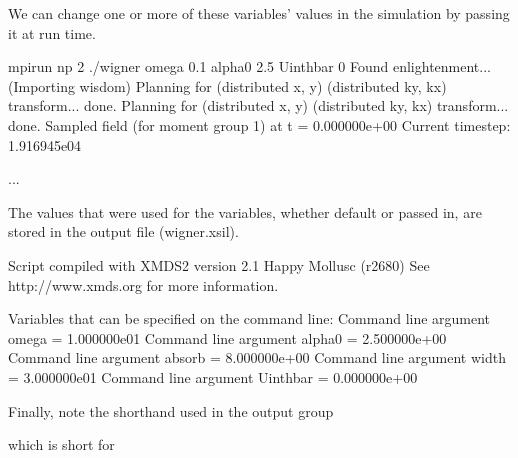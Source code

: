 \documentclass[letterpaper,10pt,english]{sphinxmanual}
\begin{document}
\sphinxAtStartPar
We can change one or more of these variables’ values in the simulation by passing it at run time.

\begin{sphinxVerbatim}[commandchars=\\\{\}]
\PYGZdl{} mpirun \PYGZhy{}np 2 ./wigner \PYGZhy{}\PYGZhy{}omega 0.1 \PYGZhy{}\PYGZhy{}alpha\PYGZus{}0 2.5 \PYGZhy{}\PYGZhy{}Uint\PYGZus{}hbar 0
Found enlightenment... (Importing wisdom)
Planning for (distributed x, y) \PYGZlt{}\PYGZhy{}\PYGZhy{}\PYGZhy{}\PYGZgt{} (distributed ky, kx) transform... done.
Planning for (distributed x, y) \PYGZlt{}\PYGZhy{}\PYGZhy{}\PYGZhy{}\PYGZgt{} (distributed ky, kx) transform... done.
Sampled field (for moment group \PYGZsh{}1) at t = 0.000000e+00
Current timestep: 1.916945e\PYGZhy{}04

...
\end{sphinxVerbatim}

\sphinxAtStartPar
The values that were used for the variables, whether default or passed in, are stored in the output file (wigner.xsil).

\begin{sphinxVerbatim}[commandchars=\\\{\}]
Script compiled with XMDS2 version 2.1 \PYGZdq{}Happy Mollusc\PYGZdq{} (r2680)
See http://www.xmds.org for more information.

Variables that can be specified on the command line:
  Command line argument omega = 1.000000e\PYGZhy{}01
  Command line argument alpha\PYGZus{}0 = 2.500000e+00
  Command line argument absorb = 8.000000e+00
  Command line argument width = 3.000000e\PYGZhy{}01
  Command line argument Uint\PYGZus{}hbar = 0.000000e+00
\end{sphinxVerbatim}

\ignorespaces 
\sphinxAtStartPar
Finally, note the shorthand used in the output group

\begin{sphinxVerbatim}[commandchars=\\\{\}]
\PYG{c+cp}{\PYGZlt{}![CDATA[}
\PYG{c+cp}{]]\PYGZgt{}}
\end{sphinxVerbatim}

\sphinxAtStartPar
which is short for

\begin{sphinxVerbatim}[commandchars=\\\{\}]
\PYG{c+cp}{\PYGZlt{}![CDATA[}
    
    
\PYG{c+cp}{]]\PYGZgt{}}
\end{sphinxVerbatim}
\end{document}
